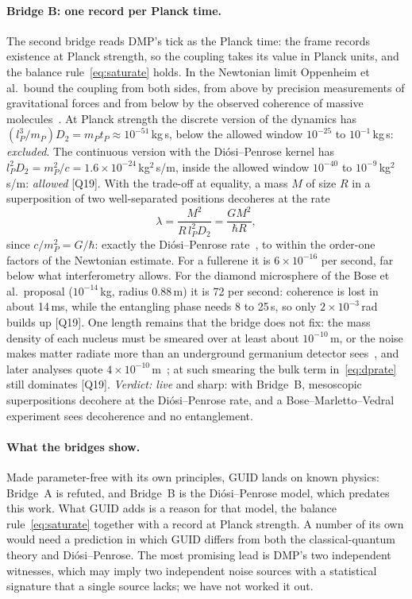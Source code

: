 \documentclass[11pt,a4paper]{article}
\theoremstyle{definition}
\theoremstyle{remark}
\newcommand{\chk}[1]{\textsf{[#1]}}
\theoremstyle{definition}
\begin{document}
\paragraph{Bridge B: one record per Planck time.} The second bridge reads DMP's tick as the Planck time: the frame records existence at
Planck strength, so the coupling takes its value in Planck units, and the balance rule~\eqref{eq:saturate} holds. In the Newtonian limit
Oppenheim et al.\ bound the coupling from both sides, from above by precision measurements of gravitational forces and from below by the
observed coherence of massive molecules~\cite{osswd}. At Planck strength the discrete version of the dynamics has
$(l_P^3/m_P)D_2=m_Pt_P\approx10^{-51}$\,kg\,s, below the allowed window $10^{-25}$ to $10^{-1}$\,kg\,s: \emph{excluded}. The continuous
version with the Di\'osi--Penrose kernel has $l_P^2D_2=m_P^2/c=1.6\times10^{-24}$\,kg$^2$\,s/m, inside the allowed window $10^{-40}$ to
$10^{-9}$\,kg$^2$\,s/m: \emph{allowed} \chk{Q19}. With the trade-off at equality, a mass $M$ of size $R$ in a superposition of two
well-separated positions decoheres at the rate
\begin{equation}\label{eq:dprate}
\lambda=\frac{M^2}{R\,l_P^2D_2}=\frac{GM^2}{\hbar R},
\end{equation}
since $c/m_P^2=G/\hbar$: exactly the Di\'osi--Penrose rate~\cite{diosi87,penrose96}, to within the order-one factors of the Newtonian
estimate. For a fullerene it is $6\times10^{-16}$ per second, far below what interferometry allows. For the diamond microsphere of the Bose
et al.\ proposal ($10^{-14}$\,kg, radius 0.88\,\textmu m) it is 72 per second: coherence is lost in about 14\,ms, while the entangling phase
needs 8 to 25\,s, so only $2\times10^{-3}$\,rad builds up \chk{Q19}. One length remains that the bridge does not fix: the mass density of each
nucleus must be smeared over at least about $10^{-10}$\,m, or the noise makes matter radiate more than an underground germanium detector
sees~\cite{donadi}, and later analyses quote $4\times10^{-10}$\,m~\cite{figurato}; at such smearing the bulk term in~\eqref{eq:dprate} still
dominates \chk{Q19}. \emph{Verdict: live} and sharp: with Bridge~B, mesoscopic superpositions decohere at the Di\'osi--Penrose rate, and a
Bose--Marletto--Vedral experiment sees decoherence and no entanglement.

\paragraph{What the bridges show.} Made parameter-free with its own principles, GUID lands on known physics: Bridge~A is refuted, and
Bridge~B is the Di\'osi--Penrose model, which predates this work. What GUID adds is a reason for that model, the balance
rule~\eqref{eq:saturate} together with a record at Planck strength. A number of its own would need a prediction in which GUID differs from
both the classical-quantum theory and Di\'osi--Penrose. The most promising lead is DMP's two independent witnesses, which may imply two
independent noise sources with a statistical signature that a single source lacks; we have not worked it out.
\end{document}
